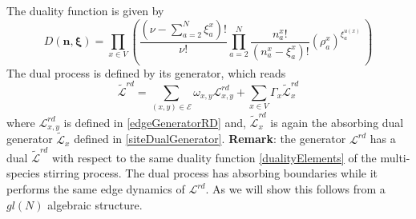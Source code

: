 \documentclass[11pt]{article}
\numberwithin{equation}{section}
\numberwithin{equation}{subsection}
\begin{document}
The duality function is given by
\begin{equation}
	D(\bm{n},\bm{\xi})=\prod_{x\in V}\left(\frac{(\nu -\sum_{a=2}^{N}\xi_{a}^{x})!}{\nu!}\prod_{a=2}^{N}\frac{n_{a}^{x}!}{(n_{a}^{x}-\xi_{a}^{x})!}\left(\rho_{a}^{x}\right)^{\xi_{a}^{u(x)}}\,\right)
\end{equation}
The dual process is defined by its generator, which reads
\begin{equation}\label{DualGeneratorRD}
	\widetilde{\mathcal{L}}^{rd}=\sum_{(x,y)\in \mathcal{E}}\omega_{x,y}\mathcal{L}_{x,y}^{rd}+\sum_{x\in V}\Gamma_{x}\widetilde{\mathcal{L}}_{x}^{rd}
\end{equation}
where 
$\mathcal{L}_{x,y}^{rd}$ is defined in \eqref{edgeGeneratorRD} and, $\widetilde{\mathcal{L}}_{x}^{rd}$ is again the absorbing dual generator $\widetilde{\mathcal{L}}_{x}$ defined in \eqref{siteDualGenerator}. 
\newline
\newline
\textbf{Remark}: the generator $\mathcal{L}^{rd}$ has a dual $\widetilde{\mathcal{L}}^{rd}$ with respect to the same duality function \eqref{dualityElements} of the multi-species stirring process. The dual process has absorbing boundaries while it performs the same edge dynamics of $\mathcal{L}^{rd}$. As we will show this follows from a $gl(N)$ algebraic structure. 
\end{document}
